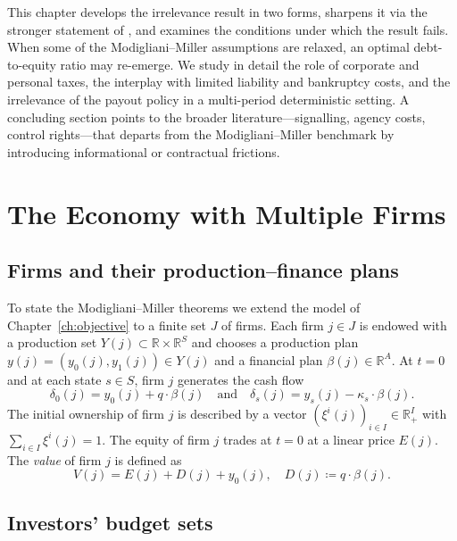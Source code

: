 \documentclass[11pt,a4paper,oneside]{book}
\def\R{\mathbb{R}}
\def\et{\quad \text{and} \quad}
\theoremstyle{plain}
\theoremstyle{definition}
\theoremstyle{remark}
\numberwithin{equation}{chapter}
\begin{document}
This chapter develops the irrelevance result in two forms, sharpens it via the stronger statement of \citet{Stiglitz1969, Stiglitz1974}, and examines the conditions under which the result fails.
When some of the Modigliani--Miller assumptions are relaxed, an optimal debt-to-equity ratio may re-emerge.
We study in detail the role of corporate and personal taxes, the interplay with limited liability and bankruptcy costs, and the irrelevance of the payout policy in a multi-period deterministic setting.
A concluding section points to the broader literature---signalling, agency costs, control rights---that departs from the Modigliani--Miller benchmark by introducing informational or contractual frictions.

\section{The Economy with Multiple Firms}
\label{sec:multi-firm}

\subsection{Firms and their production--finance plans}

To state the Modigliani--Miller theorems we extend the model of Chapter~\ref{ch:objective} to a finite set $J$ of firms.
Each firm $j \in J$ is endowed with a production set $Y(j) \subset \R \times \R^S$ and chooses a production plan $y(j) = (y_0(j), y_1(j)) \in Y(j)$ and a financial plan $\beta(j) \in \R^A$.
At $t=0$ and at each state $s \in S$, firm $j$ generates the cash flow
\begin{equation}\label{eq:cash-flow-multi}
  \delta_0(j) = y_0(j) + q \cdot \beta(j)
  \et
  \delta_s(j) = y_s(j) - \kappa_s \cdot \beta(j).
\end{equation}
The initial ownership of firm $j$ is described by a vector $(\xi^i(j))_{i \in I} \in \R_+^I$ with $\sum_{i \in I} \xi^i(j) = 1$.
The equity of firm $j$ trades at $t=0$ at a linear price $E(j)$.
The \emph{value} of firm $j$ is defined as
\begin{equation}\label{eq:firm-value-multi}
  V(j) = E(j) + D(j) + y_0(j),
  \quad
  D(j) \coloneqq q \cdot \beta(j).
\end{equation}

\subsection{Investors' budget sets}
\end{document}
